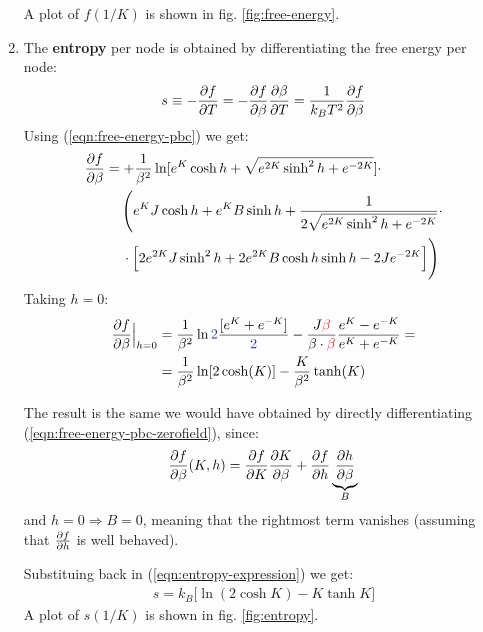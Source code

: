 \documentclass[12pt,a4paper]{report}
\begin{document}
\begin{enumerate}
        A plot of $f(1/K)$ is shown in fig. \ref{fig:free-energy}.

        \item The \textbf{entropy} per node is obtained by differentiating the free energy per node:
        \begin{align}\label{eqn:entropy-expression}
            s \equiv - \pdv{f}{T} = -\pdv{f}{\beta} \pdv{\beta}{T} = \frac{1}{k_B T^2} \pdv{f}{\beta}     
        \end{align} 
        Using (\ref{eqn:free-energy-pbc}) we get:
        \begin{align*}
            \pdv{f}{\beta} &= +\frac{1}{\beta^2} \ln [e^K \cosh h + \sqrt{e^{2K} \sinh^2 h + e^{-2K}}] \cdot\\
            &\quad\> \Bigg( e^{K} J \cosh h + e^{K} B \sinh h + \frac{1}{2 \sqrt{e^{2K} \sinh^2 h + e^{-2K}}} \cdot\\
            &\quad \> \cdot \Big[ 2 e^{2K} J \sinh^2 h + 2 e^{2K} B \cosh h \sinh h  - 2 J e^{-2K} \Big]\Bigg)
        \end{align*}
        Taking $h=0$:
        \begin{align*}
            \pdv{f}{\beta}\Big|_{h=0} &= \frac{1}{\beta^2} \ln \textcolor{Blue}{2}\frac{[e^K + e^{-K} ]}{\textcolor{Blue}{2}}  - \frac{J \textcolor{Red}{\beta}}{\beta \cdot \textcolor{Red}{\beta}} \frac{e^K - e^{-K}}{e^K + e^{-K}} =\\
            &= \frac{1}{\beta^2} \ln [2 \cosh(K)] - \frac{K}{\beta^2}\tanh(K)  
        \end{align*}

        The result is the same we would have obtained by directly differentiating (\ref{eqn:free-energy-pbc-zerofield}), since:
        \begin{align*}
            {\pdv{f}{\beta}}(K,h) = \pdv{f}{K} \pdv{K}{\beta} + \pdv{f}{h} \underbrace{\pdv{h}{\beta}}_{B} 
        \end{align*}
        and $h=0 \Rightarrow B=0$, meaning that the rightmost term vanishes (assuming that $\pdv{f}{h}$ is well behaved).

        \medskip

        Substituing back in (\ref{eqn:entropy-expression}) we get:
        \begin{align}\label{eqn:entropy-pbc}
            s = k_B \Big[\ln(2\cosh K) - K \tanh K \Big] 
        \end{align}
        A plot of $s(1/K)$ is shown in fig. \ref{fig:entropy}.


\end{enumerate}
\end{document}
